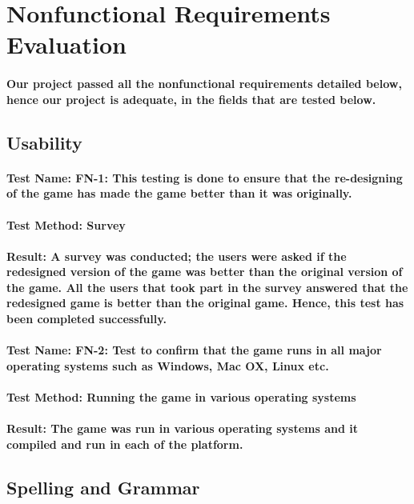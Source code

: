 \documentclass[12pt, titlepage]{article}
\begin{document}
\section{Nonfunctional Requirements Evaluation}
\paragraph {Our project passed all the nonfunctional requirements detailed below, hence our project is adequate, in the fields that are tested below.}
\subsection	{Usability}
\paragraph {Test Name: FN-1: This testing is done to ensure that the re-designing of the game has made the game better than it was originally.}
\paragraph {Test Method: Survey}
\paragraph {Result: A survey was conducted; the users were asked if the redesigned version of the game was better than the original version of the game. All the users that took part in the survey answered that the redesigned game is better than the original game. Hence, this test has been completed successfully.}

\paragraph {Test Name: FN-2: Test to conﬁrm that the game runs in all major operating systems such as Windows, Mac OX, Linux etc.}
\paragraph {Test Method: Running the game in various operating systems}
\paragraph {Result: The game was run in various operating systems and it compiled and run in each of the platform.}

\subsection	{Spelling and Grammar}
\end{document}
